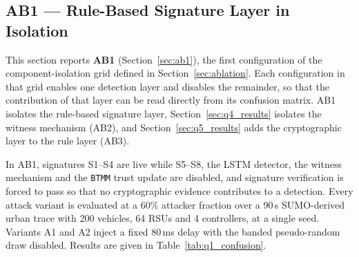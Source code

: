 \documentclass[12pt, a4paper]{report}
\begin{document}
{{%


\subsection{AB1 --- Rule-Based Signature Layer in Isolation}
\label{sec:q1_results}

This section reports \textbf{AB1}
(Section~\ref{sec:ab1}), the first configuration of the
component-isolation grid defined in
Section~\ref{sec:ablation}. Each configuration in that grid
enables one detection layer and disables the remainder, so
that the contribution of that layer can be read directly from
its confusion matrix. AB1 isolates the rule-based signature
layer, Section~\ref{sec:q4_results} isolates the witness
mechanism (AB2), and Section~\ref{sec:q5_results} adds the
cryptographic layer to the rule layer (AB3).

In AB1, signatures S1--S4 are live while S5--S8, the \ac{LSTM}
detector, the witness mechanism and the \texttt{BTMM} trust
update are disabled, and signature verification is forced to pass so
that no cryptographic evidence contributes to a detection.
Every attack variant is evaluated at a 60\% attacker fraction
over a 90\,s \ac{SUMO}-derived urban trace with 200 vehicles,
64 \ac{RSU}s and 4 controllers, at a single seed. Variants A1
and A2 inject a fixed 80\,ms delay with the banded
pseudo-random draw disabled. Results are given in
Table~\ref{tab:q1_confusion}.

}}
\end{document}
